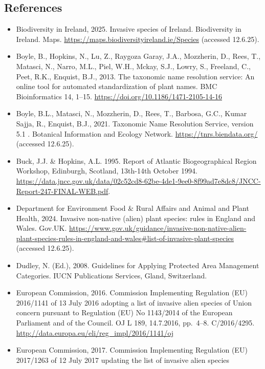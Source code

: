 \documentclass[
]{article}
\providecommand{\tightlist}{%
  \setlength{\itemsep}{0pt}\setlength{\parskip}{0pt}}
\begin{document}
\subsection{References}\label{references}

\begin{itemize}
\tightlist
\item
  Biodiversity in Ireland, 2025. Invasive species of Ireland.
  Biodiversity in Ireland. Maps.
  \url{https://maps.biodiversityireland.ie/Species} (accessed 12.6.25).
\item
  Boyle, B., Hopkins, N., Lu, Z., Raygoza Garay, J.A., Mozzherin, D.,
  Rees, T., Matasci, N., Narro, M.L., Piel, W.H., Mckay, S.J., Lowry,
  S., Freeland, C., Peet, R.K., Enquist, B.J., 2013. The taxonomic name
  resolution service: An online tool for automated standardization of
  plant names. BMC Bioinformatics 14, 1--15.
  \url{https://doi.org/10.1186/1471-2105-14-16}
\item
  Boyle, B.L., Matasci, N., Mozzherin, D., Rees, T., Barbosa, G.C.,
  Kumar Sajja, R., Enquist, B.J., 2021. Taxonomic Name Resolution
  Service, version 5.1 . Botanical Information and Ecology Network.
  \url{https://tnrs.biendata.org/} (accessed 12.6.25).
\item
  Buck, J.J. \& Hopkins, A.L. 1995. Report of Atlantic Biogeographical
  Region Workshop, Edinburgh, Scotland, 13th-14th October 1994.
  \url{https://data.jncc.gov.uk/data/02c52cd8-62be-4de1-9ee0-8f99ad7e8dc8/JNCC-Report-247-FINAL-WEB.pdf}.
\item
  Department for Environment Food \& Rural Affairs and Animal and Plant
  Health, 2024. Invasive non-native (alien) plant species: rules in
  England and Wales. Gov.UK.
  \url{https://www.gov.uk/guidance/invasive-non-native-alien-plant-species-rules-in-england-and-wales\#list-of-invasive-plant-species}
  (accessed 12.6.25).
\item
  Dudley, N. (Ed.), 2008. Guidelines for Applying Protected Area
  Management Categories. IUCN Publications Services, Gland, Switzerland.
\item
  European Commission, 2016. Commission Implementing Regulation (EU)
  2016/1141 of 13 July 2016 adopting a list of invasive alien species of
  Union concern pursuant to Regulation (EU) No 1143/2014 of the European
  Parliament and of the Council. OJ L 189, 14.7.2016, pp.~4--8.
  C/2016/4295. \url{http://data.europa.eu/eli/reg_impl/2016/1141/oj}
\item
  European Commission, 2017. Commission Implementing Regulation (EU)
  2017/1263 of 12 July 2017 updating the list of invasive alien species

\end{itemize}
\end{document}
